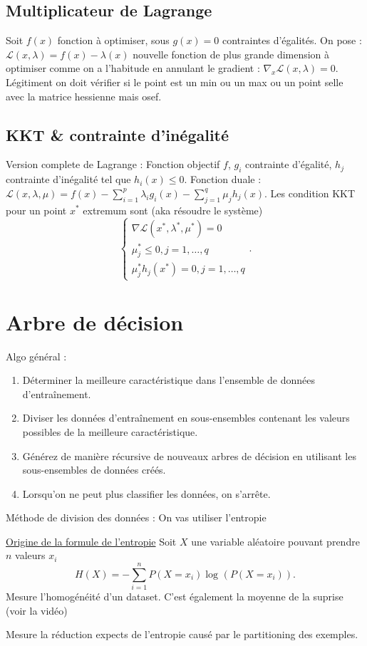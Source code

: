 \documentclass{article}
\begin{document}
\begin{multicols}{2}
\subsection{Multiplicateur de Lagrange}
Soit $ f(x) $ fonction à optimiser, sous $ g(x) = 0 $ contraintes d'égalités. On pose : $ \mathcal{L}(x,\lambda) = f(x) - \lambda  (x)$ nouvelle fonction de plus grande dimension à optimiser comme on a l'habitude en annulant le gradient : $ \nabla _x \mathcal{L}(x,\lambda ) = 0 $. Légitiment on doit vérifier si le point est un min ou un max ou un point selle avec la matrice hessienne mais osef.

\subsection{KKT \& contrainte d'inégalité}
Version complete de Lagrange : Fonction objectif $ f $, $ g_i $ contrainte d'égalité, $ h_j $ contrainte d'inégalité tel que $ h_i(x) \leq 0 $. Fonction duale : $ \mathcal{L} (x, \lambda , \mu) = f(x) - \sum_{i=1}^{p} \lambda _i g_i(x) - \sum_{j=1}^{q} \mu _j h_j(x)$. Les condition KKT pour un point $ x^* $ extremum sont (aka résoudre le système)
\[
    \begin{cases}
    \nabla \mathcal{L}(x^*, \lambda^* , \mu^* ) = 0 \\
    \mu ^*_j \leq 0, j = 1, \dots, q \\
    \mu ^*_j h_j(x^*) = 0, j =1, \dots, q
    \end{cases} 
.\]


\section{Arbre de décision}
Algo général : 
\begin{enumerate}
    \item Déterminer la meilleure caractéristique dans l'ensemble de données d'entraînement.
    \item Diviser les données d'entraînement en sous-ensembles contenant les valeurs possibles de la meilleure caractéristique.
    \item Générez de manière récursive de nouveaux arbres de décision en utilisant les sous-ensembles de données créés.
    \item Lorsqu'on ne peut plus classifier les données, on s'arrête.
\end{enumerate}
Méthode de division des données : On vas utiliser l'entropie 
\begin{defn}[Entropie]   
    \href{https://www.youtube.com/watch?v=YtebGVx-Fxw}{Origine de la formule de l'entropie}
    Soit $ X $ une variable aléatoire pouvant prendre $ n $ valeurs $ x_i $ 
    \[
        H(X) = - \sum_{i=1}^{n}P(X = x_i)\log_{} (P(X = x_i))
    .\]
    Mesure l'homogénéité d'un dataset. C'est également la moyenne de la suprise (voir la vidéo)
\end{defn}
\begin{defn}
    Mesure la réduction expects de l'entropie causé par le partitioning des exemples.


\end{defn}
\end{multicols}
\end{document}

